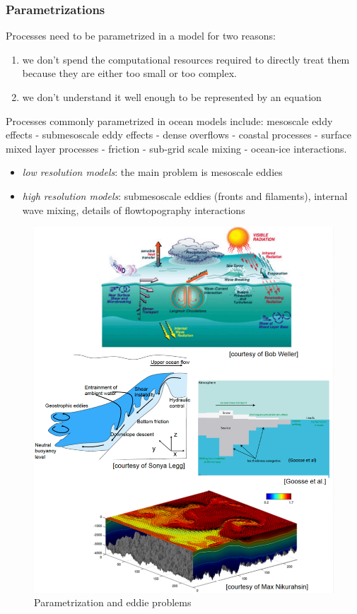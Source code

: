 \subsubsection{Parametrizations}
Processes need to be parametrized in a model for two reasons:
\begin{enumerate}
	\item we don't spend the computational resources required to directly treat them because they are either too small or too complex.
	\item we don't understand it well enough to be represented by an equation
\end{enumerate}
Processes commonly parametrized in ocean models include: mesoscale eddy effects - submesoscale eddy effects - dense
overflows - coastal processes - surface mixed layer processes
- friction - sub-grid scale mixing - ocean-ice interactions.
\begin{itemize}
	\item[] \textit{low resolution models}: the main problem is mesoscale eddies
	\item[] \textit{high resolution models}: submesoscale eddies (fronts and filaments), internal wave mixing, details of flowtopography interactions
\end{itemize}
\begin{figure}[h!]
	\centering
	\includegraphics[width=0.5\linewidth]{uploads/Screenshot 2024-11-22 104603.png}
	\caption{Parametrization and eddie problems}
	\label{fig:enter-label}
\end{figure}
